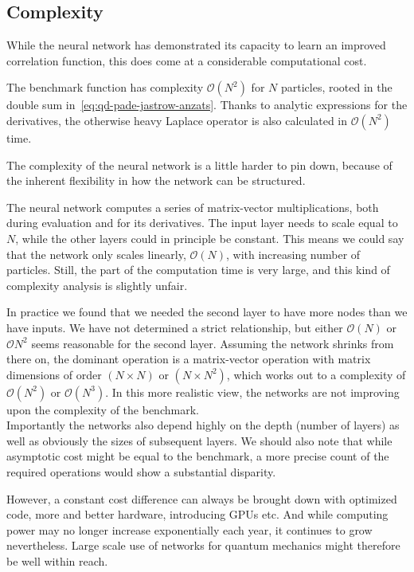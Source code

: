 \documentclass[Thesis.tex]{subfiles}
\begin{document}
\subsection{Complexity}

While the neural network has demonstrated its capacity to learn an improved
correlation function, this does come at a considerable computational cost.

The benchmark function has complexity $\mathcal{O}(N^2)$ for $N$ particles,
rooted in the double sum in~\cref{eq:qd-pade-jastrow-anzats}. Thanks to
analytic expressions for the derivatives, the otherwise heavy Laplace operator
is also calculated in $\mathcal{O}(N^2)$ time.

The complexity of the neural network is a little harder to pin down, because of
the inherent flexibility in how the network can be structured.

The neural network computes a series of matrix-vector multiplications, both during
evaluation and for its derivatives. The input layer needs to scale equal to $N$,
while the other layers could in principle be constant. This means we could say
that the network only scales linearly, $\mathcal{O}(N)$, with increasing number
of particles. Still, the  part of the computation time is very
large, and this kind of complexity analysis is slightly unfair.

In practice we found that we needed the second layer to have more
nodes than we have inputs. We have not determined a strict relationship, but
either $\mathcal{O}(N)$ or $\mathcal{O}{N^2}$ seems reasonable for the second
layer. Assuming the network shrinks from there on, the dominant operation is a
matrix-vector operation with matrix dimensions of order $(N\times N)$ or $(N\times N^2)$,
which works out to a complexity of $\mathcal{O}(N^2)$ or $\mathcal{O}(N^3)$. In
this more realistic view, the networks are not improving upon the complexity of
the benchmark.\\

Importantly the networks also depend highly on the depth (number of layers) as
well as obviously the sizes of subsequent layers. We should also note that while
asymptotic cost might be equal to the benchmark, a more precise count of the
required operations would show a substantial disparity.

However, a constant cost difference can always be brought down with optimized code, more
and better hardware, introducing GPUs etc. And while computing power may no
longer increase exponentially each year, it continues to grow nevertheless.
Large scale use of networks for quantum mechanics might therefore be well
within reach.
\end{document}
